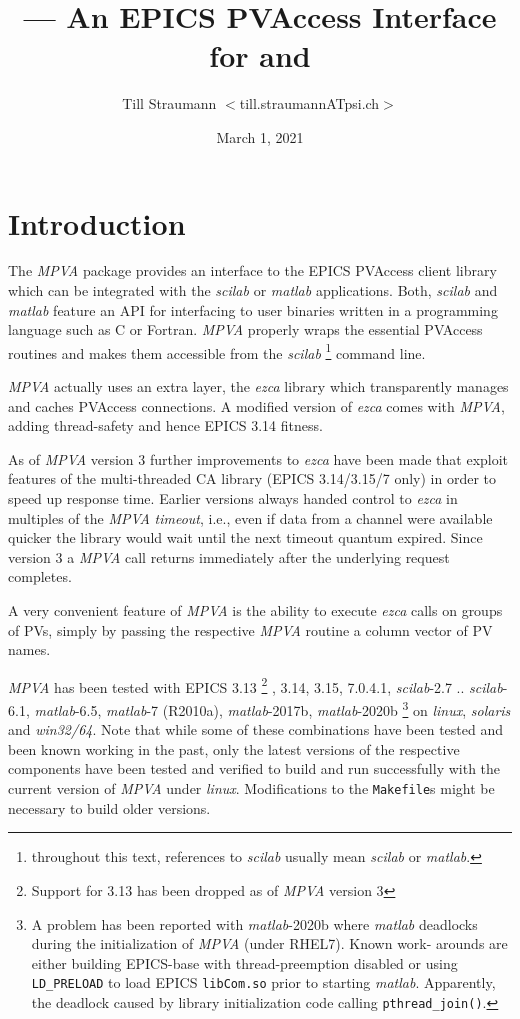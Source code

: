 \documentclass{article}
\title{\sca{} --- An EPICS PVAccess Interface for \scilab{} and \matlab{}}
\author{Till Straumann $<$till.straumannATpsi.ch$>$}
\date{March 1, 2021}
\newcommand{\sca}{\ita{MPVA}}
\newcommand{\scilab}{\ita{scilab}}
\newcommand{\matlab}{\ita{matlab}}
\newcommand{\windoze}{\ita{win32/64}}
\newcommand{\ezca}{\ita{ezca}}
\newcommand{\com}[1]{{\tt #1}}
\newcommand{\ita}[1]{\emph{#1}}
\begin{document}
\maketitle
{\hspace*{\fill}{\small\gitstring}\hspace*{\fill}}
\section{Introduction}
The \sca{} package provides an interface to the
EPICS PVAccess client library which can be
integrated with the \scilab{} or \matlab{} applications.
Both, \scilab{} and \matlab{} feature an API for interfacing
to user binaries written in a programming language such
as C or Fortran. \sca{} properly wraps the essential
PVAccess routines and makes them accessible
from the \scilab%
\footnote{throughout this text, references to \scilab{}
usually mean \scilab{} or \matlab.}
command line.

\sca{} actually uses an extra layer, the \ezca{} library
which transparently manages and caches PVAccess 
connections. A modified version of \ezca{} comes with
\sca, adding thread-safety and hence EPICS 3.14 fitness.

As of \sca{} version 3 further improvements to \ezca{}
have been made that exploit features of the multi-threaded
CA library (EPICS 3.14/3.15/7 only) in order to speed up response time.
Earlier versions always handed control to \ezca{} in multiples of the
\sca{} \ita{timeout}, i.e., even if data from a channel
were available quicker the library would wait until the
next timeout quantum expired. Since version 3 a \sca{}
call returns immediately after the underlying request
completes.

A very convenient feature of \sca{} is the ability
to execute \ezca{} calls on groups of PVs, simply by
passing the respective \sca{} routine a column vector
of PV names.

\sca{} has been tested with EPICS 3.13%
\footnote{Support for 3.13 has been dropped as of \sca{} version 3}%
,
3.14, 3.15, 7.0.4.1, \scilab-2.7 .. \scilab-6.1,
\matlab-6.5, \matlab-7 (R2010a), \matlab-2017b, \matlab-2020b%
\footnote{A problem has been reported with \matlab-2020b where \matlab{}
deadlocks during the initialization of \sca{} (under RHEL7). Known work-
arounds are either building EPICS-base with thread-preemption disabled
or using {\tt LD\_PRELOAD} to load EPICS {\tt libCom.so} prior to starting
\matlab. Apparently, the deadlock caused by library initialization code
calling {\tt pthread\_join()}.
}
on \ita{linux}, \ita{solaris} and
\windoze. Note that while some of these combinations have been
tested and been known working in the past, only the latest
versions of the respective components have been tested
and verified to build and run successfully with the
current version of \sca{} under \ita{linux}.
Modifications to the \com{Makefile}s might be necessary to
build older versions.
\end{document}
